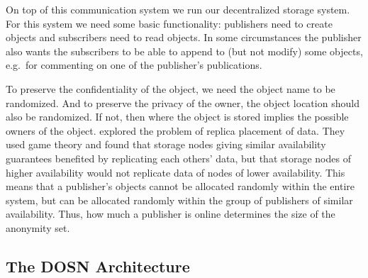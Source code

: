 On top of this communication system we run our decentralized storage system.
For this system we need some basic functionality:
publishers need to create objects and subscribers need to read objects.
In some circumstances the publisher also wants the subscribers to be able to 
append to (but not modify) some objects, e.g.\ for commenting on one of the 
publisher's publications.

To preserve the confidentiality of the object, we need the object name to be 
randomized.
And to preserve the privacy of the owner, the object location should also be 
randomized.
If not, then where the object is stored implies the possible owners of the 
object.
\citet{DataAvailability} explored the problem of replica placement of data.
They used game theory and found that storage nodes giving similar availability 
guarantees benefited by replicating each others' data, but that storage nodes 
of higher availability would not replicate data of nodes of lower availability.
This means that a publisher's objects cannot be allocated randomly within the 
entire system, but can be allocated randomly within the group of publishers of 
similar availability.
Thus, how much a publisher is online determines the size of the anonymity set.


\subsection{The \acs*{DOSN} Architecture}\label{DOSNArchitecture}

